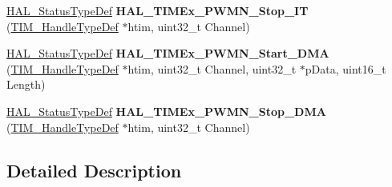 \begin{DoxyCompactItemize}
\mbox{\hyperlink{stm32f4xx__hal__def_8h_a63c0679d1cb8b8c684fbb0632743478f}{H\+A\+L\+\_\+\+Status\+Type\+Def}} {\bfseries H\+A\+L\+\_\+\+T\+I\+M\+Ex\+\_\+\+P\+W\+M\+N\+\_\+\+Stop\+\_\+\+IT} (\mbox{\hyperlink{struct_t_i_m___handle_type_def}{T\+I\+M\+\_\+\+Handle\+Type\+Def}} $\ast$htim, uint32\+\_\+t Channel)
\item 
\mbox{\label{group___t_i_m_ex___exported___functions___group3_gac525533dc108ee4915ca93d5a43cb3b5}} 
\mbox{\hyperlink{stm32f4xx__hal__def_8h_a63c0679d1cb8b8c684fbb0632743478f}{H\+A\+L\+\_\+\+Status\+Type\+Def}} {\bfseries H\+A\+L\+\_\+\+T\+I\+M\+Ex\+\_\+\+P\+W\+M\+N\+\_\+\+Start\+\_\+\+D\+MA} (\mbox{\hyperlink{struct_t_i_m___handle_type_def}{T\+I\+M\+\_\+\+Handle\+Type\+Def}} $\ast$htim, uint32\+\_\+t Channel, uint32\+\_\+t $\ast$p\+Data, uint16\+\_\+t Length)
\item 
\mbox{\label{group___t_i_m_ex___exported___functions___group3_ga10afdfdc5eed2e0288ccb969f48bc0e4}} 
\mbox{\hyperlink{stm32f4xx__hal__def_8h_a63c0679d1cb8b8c684fbb0632743478f}{H\+A\+L\+\_\+\+Status\+Type\+Def}} {\bfseries H\+A\+L\+\_\+\+T\+I\+M\+Ex\+\_\+\+P\+W\+M\+N\+\_\+\+Stop\+\_\+\+D\+MA} (\mbox{\hyperlink{struct_t_i_m___handle_type_def}{T\+I\+M\+\_\+\+Handle\+Type\+Def}} $\ast$htim, uint32\+\_\+t Channel)
\end{DoxyCompactItemize}


\subsection{Detailed Description}
